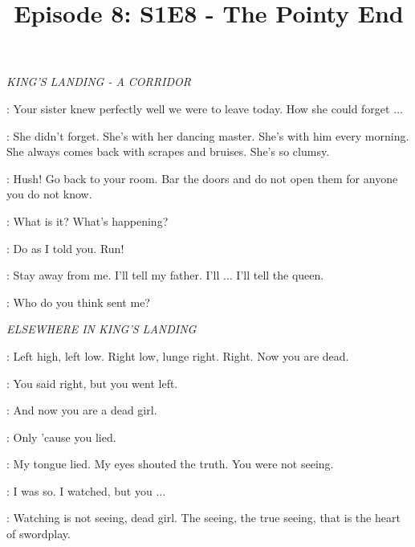 

\title{Episode 8: S1E8 - The Pointy End}
\author{}
\date{}
\maketitle




\scene

\textit{KING'S LANDING - A CORRIDOR} 


\SEPTAMORDANE: Your sister knew perfectly well we were to leave today. How she could forget $\ldots$  

\SANSA: She didn't forget. She's with her dancing master. She's with him every morning. She always comes back with scrapes and bruises. She's so clumsy. 


\SEPTAMORDANE: Hush! Go back to your room. Bar the doors and do not open them for anyone you do not know. 

\SANSA: What is it? What's happening? 

\SEPTAMORDANE: Do as I told you. Run! 


\SANSA: Stay away from me. I'll tell my father. I'll $\ldots$ I'll tell the queen. 

\HOUND: Who do you think sent me? 


\scene

\textit{ELSEWHERE IN KING'S LANDING} 


\SYRIO: Left high, left low. Right low, lunge right. Right.  Now you are dead.

\ARYA: You said right, but you went left. 

\SYRIO: And now you are a dead girl. 

\ARYA: Only 'cause you lied. 

\SYRIO: My tongue lied. My eyes shouted the truth. You were not seeing. 

\ARYA: I was so. I watched, but you $\ldots$ 

\SYRIO: Watching is not seeing, dead girl. The seeing, the true seeing, that is the heart of swordplay. 


